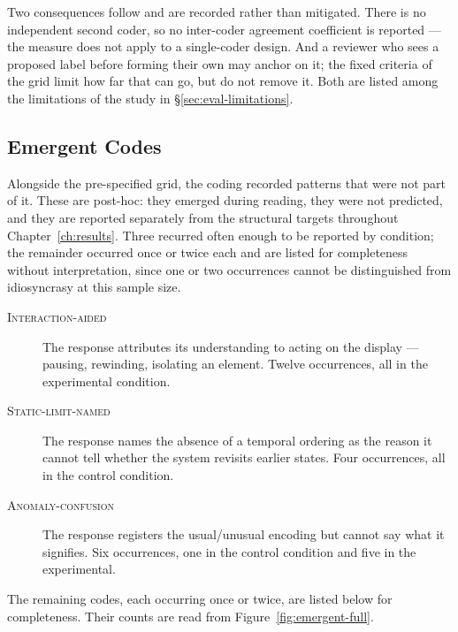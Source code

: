 Two consequences follow and are recorded rather than mitigated. There is no independent
second coder, so no inter-coder agreement coefficient is reported --- the measure does not
apply to a single-coder design. And a reviewer who sees a proposed label before forming their
own may anchor on it; the fixed criteria of the grid limit how far that can go, but do not
remove it. Both are listed among the limitations of the study in \S\ref{sec:eval-limitations}.

\subsection{Emergent Codes}
\label{subsec:app-emergent}

Alongside the pre-specified grid, the coding recorded patterns that were not part of it.
These are post-hoc: they emerged during reading, they were not predicted, and they are
reported separately from the structural targets throughout Chapter~\ref{ch:results}. Three
recurred often enough to be reported by condition; the remainder occurred once or twice each
and are listed for completeness without interpretation, since one or two occurrences cannot be
distinguished from idiosyncrasy at this sample size.

\begin{description}
\item[\textnormal{\textsc{Interaction-aided}}] The response attributes its understanding to
acting on the display --- pausing, rewinding, isolating an element. Twelve occurrences, all
in the experimental condition.

\item[\textnormal{\textsc{Static-limit-named}}] The response names the absence of a temporal
ordering as the reason it cannot tell whether the system revisits earlier states. Four
occurrences, all in the control condition.

\item[\textnormal{\textsc{Anomaly-confusion}}] The response registers the usual/unusual
encoding but cannot say what it signifies. Six occurrences, one in the control condition and
five in the experimental.
\end{description}

The remaining codes, each occurring once or twice, are listed below for completeness. Their
counts are read from Figure~\ref{fig:emergent-full}.

